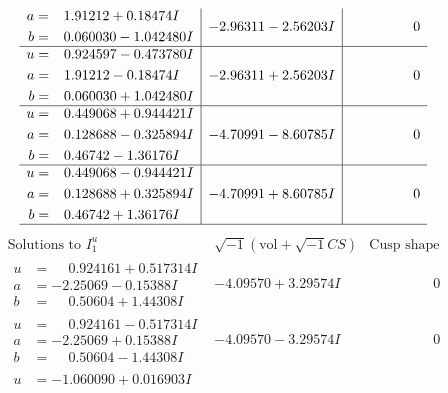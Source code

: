 \documentclass[1p]{elsarticle_modified}
\theoremstyle{definition}
\newcommand{\I}{\sqrt{-1}}
\begin{document}
$$\begin{array}{c|c|c}
\begin{aligned}
a &= \phantom{-}1.91212 + 0.18474 I \\
b &= \phantom{-}0.060030 - 1.042480 I\end{aligned}
 & -2.96311 - 2.56203 I & \phantom{-0.000000 } 0 \\ \hline\begin{aligned}
u &= \phantom{-}0.924597 - 0.473780 I \\
a &= \phantom{-}1.91212 - 0.18474 I \\
b &= \phantom{-}0.060030 + 1.042480 I\end{aligned}
 & -2.96311 + 2.56203 I & \phantom{-0.000000 } 0 \\ \hline\begin{aligned}
u &= \phantom{-}0.449068 + 0.944421 I \\
a &= \phantom{-}0.128688 - 0.325894 I \\
b &= \phantom{-}0.46742 - 1.36176 I\end{aligned}
 & -4.70991 - 8.60785 I & \phantom{-0.000000 } 0 \\ \hline\begin{aligned}
u &= \phantom{-}0.449068 - 0.944421 I \\
a &= \phantom{-}0.128688 + 0.325894 I \\
b &= \phantom{-}0.46742 + 1.36176 I\end{aligned}
 & -4.70991 + 8.60785 I & \phantom{-0.000000 } 0\\
 \hline 
 \end{array}$$\newpage$$\begin{array}{c|c|c}  
\text{Solutions to }I^u_{1}& \I (\text{vol} + \sqrt{-1}CS) & \text{Cusp shape}\\
 \hline 
\begin{aligned}
u &= \phantom{-}0.924161 + 0.517314 I \\
a &= -2.25069 - 0.15388 I \\
b &= \phantom{-}0.50604 + 1.44308 I\end{aligned}
 & -4.09570 + 3.29574 I & \phantom{-0.000000 } 0 \\ \hline\begin{aligned}
u &= \phantom{-}0.924161 - 0.517314 I \\
a &= -2.25069 + 0.15388 I \\
b &= \phantom{-}0.50604 - 1.44308 I\end{aligned}
 & -4.09570 - 3.29574 I & \phantom{-0.000000 } 0 \\ \hline\begin{aligned}
u &= -1.060090 + 0.016903 I \\

\end{aligned}
\end{array}$$
\end{document}
